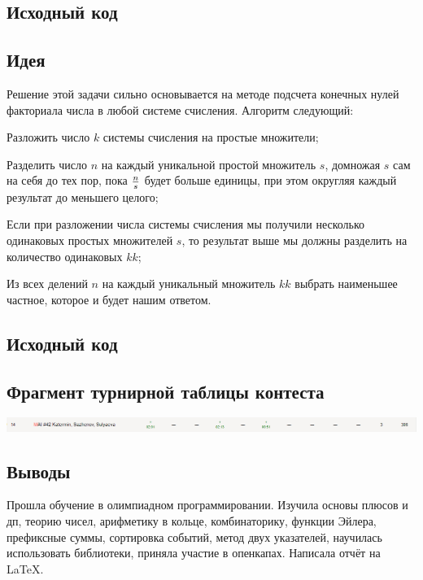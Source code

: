\subsection*{Исходный код}


\subsection*{Идея}
Решение этой задачи сильно основывается на методе подсчета конечных нулей факториала числа в любой системе счисления. Алгоритм следующий:
\begin{center}  
  \item Разложить число $k$ системы счисления на простые множители;
  \item Разделить число $n$ на каждый уникальной простой множитель $s$, домножая $s$ сам на себя до тех пор, пока $n \over s$ будет больше единицы, при этом округляя каждый результат до меньшего целого;
  \item Если при разложении числа системы счисления мы получили несколько одинаковых простых множителей $s$, то результат выше мы должны разделить на количество одинаковых $kk$;
  \item Из всех делений $n$ на каждый уникальный множитель $kk$ выбрать наименьшее частное, которое и будет нашим ответом.
\end{center} 
\subsection*{Исходный код}

\subsection*{Фрагмент турнирной таблицы контеста}
\includegraphics[scale=0.4]{standings/0105.png}\newline\noindent

\subsection*{Выводы}
Прошла обучение в олимпиадном программировании. Изучила основы плюсов и дп, теорию чисел, арифметику в кольце, комбинаторику, функции Эйлера, префиксные суммы, сортировка событий, метод двух указателей, научилась использовать библиотеки, приняла участие в опенкапах. Написала отчёт на LaTeX.
\pagebreak
